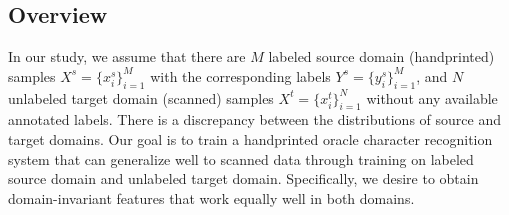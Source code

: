 \documentclass[10pt,journal,compsoc,twocolumn ]{IEEEtran}
\begin{document}
\subsection{Overview}

In our study, we assume that there are $M$ labeled source domain (handprinted) samples $X^s=\{{x^{s}_{i}}\}^{M}_{i=1}$ with the corresponding labels $Y^s=\{{y^{s}_{i}}\}^{M}_{i=1}$, and $N$ unlabeled target domain (scanned) samples $X^t=\{{x^{t}_{i}}\}^{N}_{i=1}$ without any available annotated labels.
There is a discrepancy between the distributions of source and target domains. Our goal is to train a handprinted oracle character recognition system that can generalize well to scanned data through training on labeled source domain and unlabeled target domain. Specifically, we desire to obtain domain-invariant features that work equally well in both domains.
\end{document}
